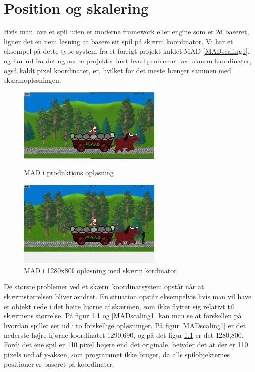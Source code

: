 \documentclass[Main.tex]{PositionOgSkalering}
\begin{document}
\chapter{Position og skalering}
Hvis man lave et spil uden et moderne framework eller engine som er 2d baseret, ligner det en nem løsning at basere sit spil på skærm koordinator. Vi har et eksempel på dette type system fra et forrigt projekt kaldet MAD \ref{MADscaling1}, og har ud fra det og andre projekter lært hvad problemet ved skærm koordinater, også kaldt pixel koordinater, er, hvilket for det meste hænger sammen med skærmopløsningen.

\begin{figure}[h]
\centering
\parbox{7cm}{   
\includegraphics[width = 7cm]{billeder/MADscaling1}
\caption{MAD i produktions opløsning}    
\label{MADscaling1}}
\qquad
\begin{minipage}{7cm}
\includegraphics[width = 7cm]{billeder/MADscaling2}
\caption{MAD i 1280x800 opløsning med skærm kordinator}    
\label{MADscaling2}
\end{minipage}
\end{figure}

De største problemer ved et skærm koordinatsystem opstår når at skærmstørrelsen bliver ændret. En situation opstår eksempelvis hvis man vil have et objekt nede i det højre hjørne af skærmen, som ikke flytter sig relativt til skærmens størrelse. På figur \ref{MADscaling2} og \ref{MADscaling1} kan man se at forskellen på hvordan spillet ser ud i to forskellige opløsninger. På figur \ref{MADscaling1} er det nederste højre hjørne koordinatet 1290,690, og på det figur \ref{MADscaling2} er det 1280,800. Fordi det ene spil er 110 pixel højere end det originale, betyder det at der er 110 pixels ned af y-aksen, som programmet ikke bruger, da alle spilobjekternes positioner er baseret på koordinater.
\end{document}
